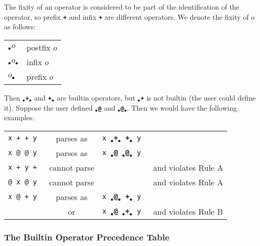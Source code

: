 \documentclass[12pt]{article}
\newcommand{\TT}[1]{{\tt \bfseries #1}}
\begin{document}
\newcommand{\IX}[1]{$_{\bullet}$\TT{#1}$_{\bullet}$}
\newcommand{\RX}[1]{\TT{#1}$_{\bullet}$}
\newcommand{\LX}[1]{$_{\bullet}$\TT{#1}}

The fixity of an operator is considered to be part of
the identification of the operator, so prefix \TT{+}
and infix \TT{+} are different operators.
We denote the fixity of \TT{$o$} as follows:
\begin{center}
\begin{tabular}{ll}
\LX{$o$} & postfix \TT{$o$} \\
\IX{$o$} & infix \TT{$o$} \\
\RX{$o$} & prefix \TT{$o$} \\
\end{tabular}
\end{center}

Then \IX{+} and \RX{+} are builtin operators, but \LX{+}
is not builtin (the user could define it).  Suppose the
user defined \LX{@} and \IX{@}.  Then we would have the
following examples:

\begin{center}
\begin{tabular}{lcll}
\tt x + + y	& parses as & \tt x \IX{+} \RX{+} y \\
\tt x @ @ y	& parses as & \tt x \LX{@} \IX{@} y \\
\tt x + y +	& cannot parse & & and violates Rule A \\
\tt @ x @ y	& cannot parse & & and violates Rule A \\
\tt x @ + y	& parses as & \tt x \IX{@} \RX{+} y \\
		& or        & \tt x \LX{@} \IX{+} y
			    & and violates Rule B \\
\end{tabular}
\end{center}

\subsubsection{The Builtin Operator Precedence Table}
\label{THE-BUILTIN-OPERATOR-PRECEDENCE-TABLE}
\end{document}
